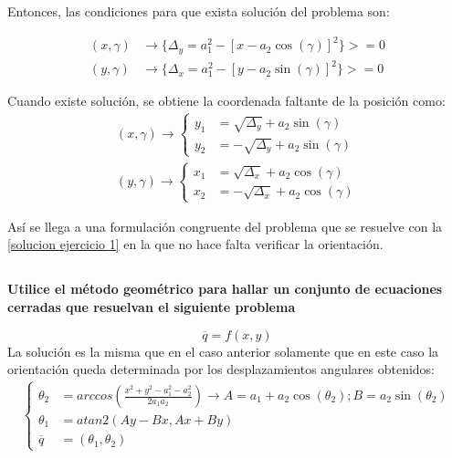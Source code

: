 \documentclass[a4paper,12pt]{article}
\begin{document}
Entonces, las condiciones para que exista solución del problema son:

\begin{align*}
    \left(x, \gamma\right)&\rightarrow\{\Delta_y = a_1^2 - \left[x - a_2\cos(\gamma)\right]^2\} >= 0\\
    \left(y, \gamma\right)&\rightarrow\{\Delta_x = a_1^2 - \left[y - a_2\sin(\gamma)\right]^2\} >= 0
\end{align*}

Cuando existe solución, se obtiene la coordenada faltante de la posición como:
\begin{align*}
    \left(x, \gamma\right)\rightarrow
    \begin{cases}
        y_1 &= \sqrt{\Delta_y} + a_2\sin(\gamma)\\
        y_2 &= -\sqrt{\Delta_y} + a_2\sin(\gamma)
    \end{cases}
    \\
    \left(y, \gamma\right)\rightarrow
    \begin{cases}
        x_1 &= \sqrt{\Delta_x} + a_2\cos(\gamma)\\
        x_2 &= -\sqrt{\Delta_x} + a_2\cos(\gamma)
    \end{cases}
\end{align*}

Así se llega a una formulación congruente del problema que se resuelve con la \cref{solucion ejercicio 1} en la que no hace falta verificar la orientación.



\subsection{}
\textbf{Utilice el método geométrico para hallar un conjunto de ecuaciones cerradas que resuelvan el siguiente problema}

\begin{equation*}
    \overline{q} = f\left(x,y\right)
\end{equation*}
La solución es la misma que en el caso anterior solamente que en este caso la orientación queda determinada por los desplazamientos angulares obtenidos:
\begin{align}
    \begin{cases}
        \theta_2 &= arccos\left(\frac{x^2 + y^2 - a_{1}^2 - a_{2}^2}{2a_{1}a_{2}}\right) \rightarrow A = a_1 + a_2\cos(\theta_2); B = a_2\sin(\theta_2)\\
        \theta_1 &=  atan2(Ay-Bx, Ax + By)\\
        \overline{q} &= (\theta_1, \theta_2)
    \end{cases}
\end{align}
\end{document}
